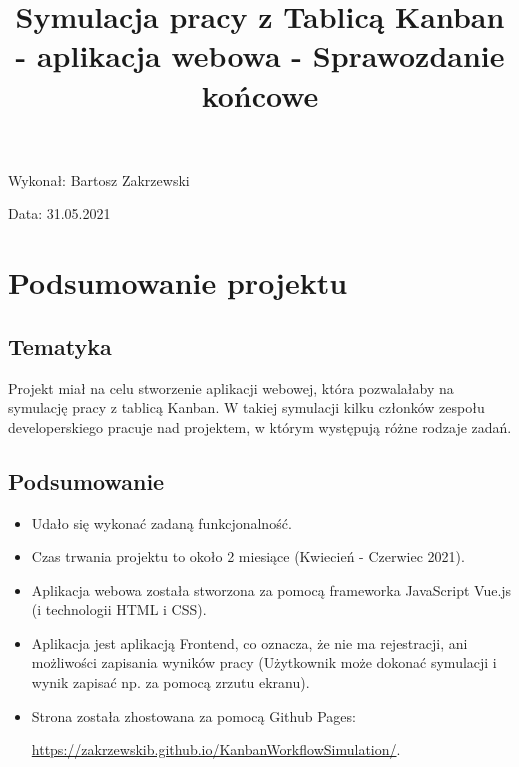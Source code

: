 \documentclass{article}
\title{Symulacja pracy z Tablicą Kanban - aplikacja webowa - Sprawozdanie końcowe}
\author{}
\date{}
\begin{document}
\maketitle

\begin{flushright}
\par
\vfill
\par
Wykonał: Bartosz Zakrzewski

Data: 31.05.2021

\end{flushright}
\thispagestyle{empty}

\tableofcontents

\section{Podsumowanie projektu}

\subsection{Tematyka}
Projekt miał na celu stworzenie aplikacji webowej, która pozwalałaby na symulację pracy z tablicą Kanban. W takiej symulacji kilku członków zespołu developerskiego pracuje nad projektem, w którym występują różne rodzaje zadań.

\subsection{Podsumowanie}

\begin{itemize}
    \item Udało się wykonać zadaną funkcjonalność.
    
    \item Czas trwania projektu to około 2 miesiące (Kwiecień - Czerwiec 2021).
    
    \item Aplikacja webowa została stworzona za pomocą frameworka JavaScript Vue.js (i technologii HTML i CSS).

    \item Aplikacja jest aplikacją Frontend, co oznacza, że nie ma rejestracji, ani możliwości zapisania wyników pracy (Użytkownik może dokonać symulacji i wynik zapisać np. za pomocą zrzutu ekranu).
    
    \item Strona została zhostowana za pomocą Github Pages:
    
    \href{https://zakrzewskib.github.io/KanbanWorkflowSimulation/}{https://zakrzewskib.github.io/KanbanWorkflowSimulation/}.
    
\end{itemize}
\end{document}
